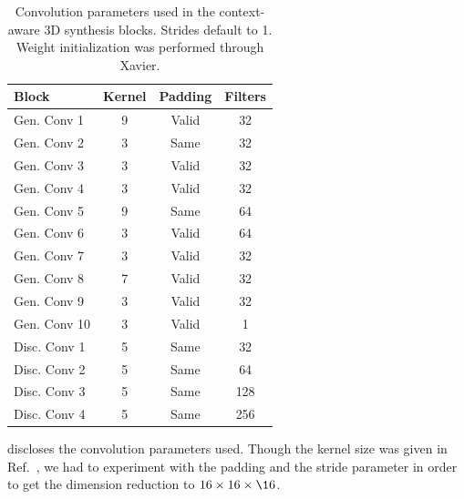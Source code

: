 \begin{table}[h]
  \centering
  \begin{tabular}{lccc}
    \toprule
    Block         & Kernel  & Padding & Filters \\
    \midrule
    Gen. Conv 1   & \num{9} & Valid   & 32      \\
    Gen. Conv 2   & \num{3} & Same    & 32      \\
    Gen. Conv 3   & \num{3} & Valid   & 32      \\
    Gen. Conv 4   & \num{3} & Valid   & 32      \\
    Gen. Conv 5   & \num{9} & Same    & 64      \\
    Gen. Conv 6   & \num{3} & Valid   & 64      \\
    Gen. Conv 7   & \num{3} & Valid   & 32      \\
    Gen. Conv 8   & \num{7} & Valid   & 32      \\
    Gen. Conv 9   & \num{3} & Valid   & 32      \\
    Gen. Conv 10  & \num{3} & Valid   & 1       \\
    Disc. Conv 1  & \num{5} & Same    & 32      \\
    Disc. Conv 2  & \num{5} & Same    & 64      \\
    Disc. Conv 3  & \num{5} & Same    & 128     \\
    Disc. Conv 4  & \num{5} & Same    & 256     \\
    \bottomrule
  \end{tabular}
  \caption{Convolution parameters used in the context-aware 3D synthesis
    blocks. Strides default to \num{1}. Weight initialization was performed
    through Xavier.
  }\label{tab:synthesis:conv}
\end{table}
 discloses the convolution parameters used. Though
the kernel size was given in Ref.~\cite{Nie16}, we had to experiment with
the padding and the stride parameter in order to get the dimension reduction
to $16\times16\times\16$.
